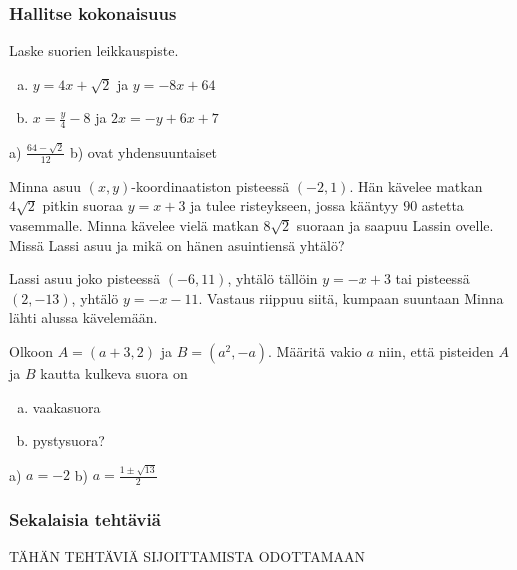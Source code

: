 \begin{tehtavasivu}
\subsubsection*{Hallitse kokonaisuus}

\begin {tehtava}
Laske suorien leikkauspiste.
\begin{enumerate} [a)]
\item $y=4x+\sqrt{2}$ ja $y=-8x+64$
\item $x=\frac{y}{4}-8$ ja $2x=-y+6x+7$
\end{enumerate}
\begin {vastaus}
a) $\frac{64-\sqrt{2}}{12}$ b) ovat yhdensuuntaiset
\end {vastaus}
\end {tehtava}

\begin {tehtava}
Minna asuu $(x,y)$-koordinaatiston pisteessä $(-2,1)$. Hän kävelee matkan $4\sqrt{2}$ pitkin suoraa $y=x+3$ ja tulee risteykseen, jossa kääntyy $90$ astetta vasemmalle. Minna kävelee vielä matkan $8\sqrt{2}$ suoraan ja saapuu Lassin ovelle. Missä Lassi asuu ja mikä on hänen asuintiensä yhtälö?
\begin {vastaus}
Lassi asuu joko pisteessä $(-6,11)$, yhtälö tällöin $y=-x+3$ tai pisteessä $(2,-13)$, yhtälö $y=-x-11$. Vastaus riippuu siitä, kumpaan suuntaan Minna lähti alussa kävelemään.
\end {vastaus}
\end {tehtava}

\begin {tehtava}
Olkoon $A=(a+3,2)$ ja $B=(a^2,-a)$. Määritä vakio $a$ niin, että pisteiden $A$ ja $B$ kautta kulkeva suora on
\begin{enumerate} [a)]
\item vaakasuora
\item pystysuora?
\end{enumerate}
\begin {vastaus}
a) $a=-2$ b) $a=\frac{1\pm\sqrt{13}}{2} $
\end {vastaus}
\end {tehtava}

\subsubsection*{Sekalaisia tehtäviä}

TÄHÄN TEHTÄVIÄ SIJOITTAMISTA ODOTTAMAAN

\end{tehtavasivu}

